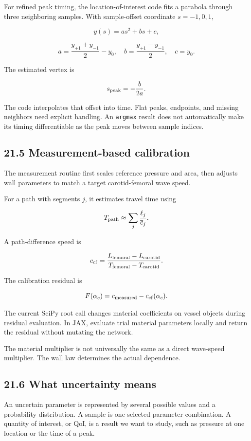 \documentclass[11pt,a4paper]{article}
\begin{document}
For refined peak timing, the location-of-interest code fits a parabola through three neighboring samples. With sample-offset coordinate \(s=-1,0,1\),


\begingroup\small
\[
y(s)=as^2+bs+c,
\]
\endgroup



\begingroup\small
\[
a=\frac{y_{+1}+y_{-1}}2-y_0,\quad
b=\frac{y_{+1}-y_{-1}}2,\quad c=y_0.
\]
\endgroup


The estimated vertex is


\begingroup\small
\[
s_{\rm peak}=-\frac b{2a}.
\]
\endgroup


The code interpolates that offset into time. Flat peaks, endpoints, and missing neighbors need explicit handling. An \texttt{argmax} result does not automatically make its timing differentiable as the peak moves between sample indices.

\subsection{21.5 Measurement-based calibration}
The measurement routine first scales reference pressure and area, then adjusts wall parameters to match a target carotid-femoral wave speed.

For a path with segments \(j\), it estimates travel time using


\begingroup\small
\[
T_{\rm path}\approx
\sum_j\frac{\ell_j}{\overline c_j}.
\]
\endgroup


A path-difference speed is


\begingroup\small
\[
c_{\rm cf}
=
\frac{L_{\rm femoral}-L_{\rm carotid}}
{T_{\rm femoral}-T_{\rm carotid}}.
\]
\endgroup


The calibration residual is


\begingroup\small
\[
F(\alpha_c)=c_{\rm measured}-c_{\rm cf}(\alpha_c).
\]
\endgroup


The current SciPy root call changes material coefficients on vessel objects during residual evaluation. In JAX, evaluate trial material parameters locally and return the residual without mutating the network.

The material multiplier is not universally the same as a direct wave-speed multiplier. The wall law determines the actual dependence.

\subsection{21.6 What uncertainty means}
An uncertain parameter is represented by several possible values and a probability distribution. A sample is one selected parameter combination. A quantity of interest, or QoI, is a result we want to study, such as pressure at one location or the time of a peak.
\end{document}
